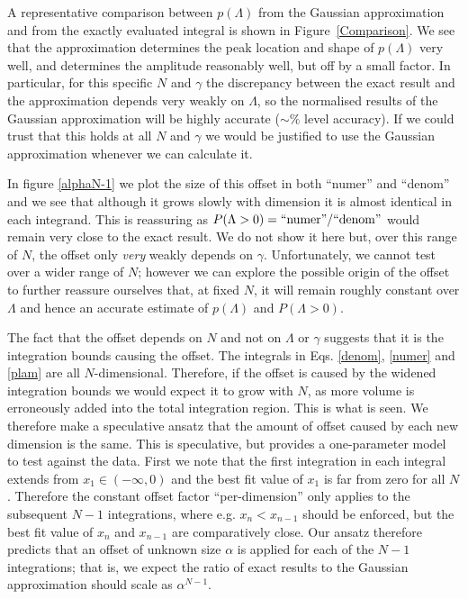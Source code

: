 \documentclass[12pt]{article}
\begin{document}
A representative comparison between $p(\Lambda)$ from the Gaussian approximation and from the exactly evaluated integral is shown in Figure~\ref{Comparison}. We see that the approximation determines the peak location and shape of $p(\Lambda)$ very well, and determines the amplitude reasonably well, but off by a small factor. In particular, for this specific $N$ and $\gamma$ the discrepancy between the exact result and the approximation depends very weakly on $\Lambda$, so the normalised results of the Gaussian approximation will be highly accurate ($\sim\%$ level accuracy). If we could trust that this holds at all $N$ and $\gamma$ we would be justified to use the Gaussian approximation whenever we can calculate it.

In figure \ref{alphaN-1} we plot the size of this offset in both ``numer'' and ``denom'' and we see that although it grows slowly with dimension it is almost identical in each integrand. This is reassuring as $P(\Lambda>0)={\rm ``numer"}/{\rm ``denom"}$ would remain very close to the exact result. We do not show it here but, over this range of $N$, the offset only \emph{very} weakly depends on $\gamma$. Unfortunately, we cannot test over a wider range of $N$; however we can explore the possible origin of the offset to further reassure ourselves that, at fixed $N$, it will remain roughly constant over $\Lambda$ and hence an accurate estimate of $p(\Lambda)$ and $P(\Lambda>0)$.

The fact that the offset depends on $N$ and not on $\Lambda$ or $\gamma$ suggests that it is the integration bounds causing the offset. The integrals in Eqs. \eqref{denom}, \eqref{numer} and \eqref{plam} are all $N$-dimensional. Therefore, if the offset is caused by the widened integration bounds we would expect it to grow with $N$, as more volume is erroneously added into the total integration region. This is what is seen. We therefore make a speculative ansatz that the amount of offset caused by each new dimension is the same. This is speculative, but provides a one-parameter model to test against the data. First we note that the first integration in each integral extends from $x_1\in(-\infty,0)$ and the best fit value of $x_1$ is far from zero for all $N$. Therefore the constant offset factor ``per-dimension'' only applies to the subsequent $N-1$ integrations, where e.g. $x_n<x_{n-1}$ should be enforced, but the best fit value of $x_n$ and $x_{n-1}$ are comparatively close. Our ansatz therefore predicts that an offset of unknown size $\alpha$ is applied for each of the $N-1$ integrations; that is, we expect the ratio of exact results to the Gaussian approximation should scale as $\alpha^{N-1}$.
\end{document}
